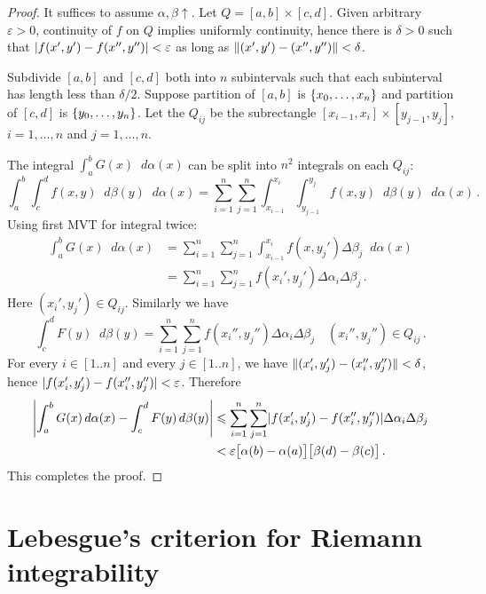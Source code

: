 \documentclass{article}
\DeclarePairedDelimiter\set{\lbrace}{\rbrace}
\DeclarePairedDelimiter\abs{\lvert}{\rvert}
\DeclarePairedDelimiter\norm{\lVert}{\rVert}
\newcommand{\dd}{\mathop{}\!d}
\newcommand{\increasing}{\uparrow}
\begin{document}
\begin{proof}
    It suffices to assume $ \alpha, \beta \increasing $. Let $ Q = [a, b] \times [c, d] $. Given arbitrary $ \varepsilon > 0 $, continuity of $ f $ on $ Q $ implies uniformly continuity, hence there is $ \delta > 0 $ such that $ \abs{ f(x', y') - f(x'', y'') } < \varepsilon $ as long as $ \norm{(x', y') - (x'', y'')} < \delta $.
    
    Subdivide $ [a, b] $ and $ [c, d] $ both into $ n $ subintervals such that each subinterval has length less than $ \delta / 2 $. Suppose partition of $ [a, b] $ is $ \set{x_0, \dots, x_n} $ and partition of $ [c, d] $ is $ \set{y_0, \dots, y_n} $. Let the $ Q_{ij} $ be the subrectangle $ [x_{i-1}, x_i] \times [y_{j-1}, y_j] $, $ i = 1, \dots, n $ and $ j = 1, \dots, n $.

    The integral $ \int_a^b G(x) \dd \alpha(x) $ can be split into $ n^2 $ integrals on each $ Q_{ij} $:
    \[ 
        \int_a^b \int_c^d f(x, y) \dd \beta(y) \dd \alpha(x) = \sum_{i=1}^{n} \sum_{j=1}^{n} \int_{x_{i-1}}^{x_i} \int_{y_{j-1}}^{y_j} f(x, y) \dd \beta(y) \dd \alpha(x) \,.
    \]
    Using first MVT for integral twice:
    \begin{align*}
        \int_a^b G(x) \dd \alpha(x) &= \sum_{i=1}^{n} \sum_{j=1}^{n} \int_{x_{i-1}}^{x_i}  f(x, y_j') \Delta \beta_j \dd \alpha(x) \\
        &= \sum_{i=1}^{n} \sum_{j=1}^{n} f(x_i', y_j') \Delta \alpha_i \Delta \beta_j \,.
    \end{align*}
    Here $ (x_i', y_j') \in Q_{ij} $. Similarly we have
    \[ 
        \int_c^d F(y) \dd \beta(y) = \sum_{i=1}^{n} \sum_{j=1}^{n} f(x_i'', y_j'') \Delta \alpha_i \Delta \beta_j \quad (x_i'', y_j'') \in Q_{ij} \,.
    \]
    For every $ i \in [1 .. n] $ and every $ j \in [1 .. n] $, we have $ \norm{(x_i', y_j') - (x_i'', y_j'')} < \delta $, hence $ \abs{ f(x_i', y_j') - f(x_i'', y_j'') } < \varepsilon $. Therefore
    \begin{align*}
        \abs*{ \int_a^b G(x) \dd \alpha(x) - \int_c^d F(y) \dd \beta(y) } &\leqslant \sum_{i=1}^{n} \sum_{j=1}^{n} \abs{ f(x_i', y_j') - f(x_i'', y_j'') } \Delta \alpha_i \Delta \beta_j \\
        &< \varepsilon \big[ \alpha(b) - \alpha(a) \big] \big[ \beta(d) - \beta(c) \big] \,.
    \end{align*}
    This completes the proof.
\end{proof}

\section{Lebesgue's criterion for Riemann integrability}
\end{document}
